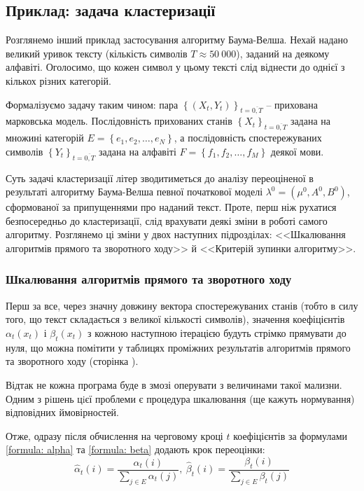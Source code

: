 \subsection{Приклад: задача кластеризації}

Розглянемо інший приклад застосування алгоритму Баума-Велша. Нехай надано великий уривок тексту (кількість символів $T\approx 50\ 000$), заданий на деякому алфавіті. Оголосимо, що кожен символ у цьому тексті слід віднести до однієї з кількох різних категорій.

Формалізуємо задачу таким чином: пара $\left\{(X_t,Y_t)\right\}_{t=\overline{0,T}}$ -- прихована марковська модель. Послідовність прихованих станів $\left\{ X_t \right\}_{t=\overline{0,T}}$ задана на множині категорій $E=\left\{e_1,e_2, \ldots, e_N\right\}$, а послідовність спостережуваних символів $\left\{ Y_t \right\}_{t=\overline{0,T}}$ задана на алфавіті $F=\left\{f_1,f_2, \ldots, f_M\right\}$ деякої мови.

Суть задачі кластеризації літер зводитиметься до аналізу переоціненої в результаті алгоритму Баума-Велша певної початкової моделі $\lambda^0=(\mu^0,A^0,B^0)$, сформованої за припущеннями про наданий текст. Проте, перш ніж рухатися безпосередньо до кластеризації, слід врахувати деякі зміни в роботі самого алгоритму. Розглянемо ці зміни у двох наступних підрозділах: <<Шкалювання алгоритмів прямого та зворотного ходу>> й <<Критерій зупинки алгоритму>>.

\subsubsection{Шкалювання алгоритмів прямого та зворотного ходу}

Перш за все, через значну довжину вектора спостережуваних станів (тобто в силу того, що текст складається з великої кількості символів), значення коефіцієнтів $\alpha_t(x_t)$ і $\beta_t(x_t)$ з кожною наступною ітерацією будуть стрімко прямувати до нуля, що можна помітити у таблицях проміжних результатів алгоритмів прямого та зворотного ходу (сторінка \pageref{table: forward/backward algorithms}).

Відтак не кожна програма буде в змозі оперувати з величинами такої мализни. Одним з рiшень цiєї проблеми є процедура шкалювання (ще кажуть нормування) відповідних ймовірностей.

Отже, одразу після обчислення на черговому кроці $t$ коефіцієнтів за формулами \eqref{formula: alpha} та \eqref{formula: beta} додають крок переоцінки:
\begin{equation*}
    \widehat{\alpha}_t(i) = \frac{\alpha_t(i)}{\sum\limits_{j \in E}\alpha_t(j)}, \ 
    \widehat{\beta}_t(i) = \frac{\beta_t(i)}{\sum\limits_{j \in E}\beta_t(j)} 
\end{equation*}

